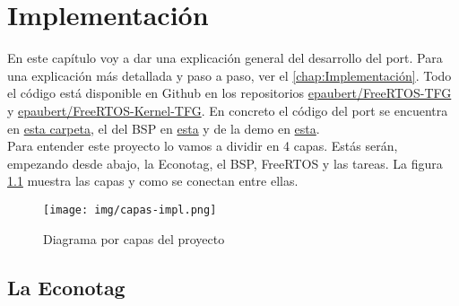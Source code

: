 \chapter{Implementación}


En este capítulo voy a dar una explicación general del desarrollo del port. Para una explicación más detallada y paso a paso, ver el \autoref{chap:Implementación}. Todo el código está disponible en Github en los repositorios \href{https://github.com/epaubert/FreeRTOS-TFG}{epaubert/FreeRTOS-TFG} y \href{https://github.com/epaubert/FreeRTOS-Kernel-TFG}{epaubert/FreeRTOS-Kernel-TFG}. En concreto el código del port se encuentra en \href{https://github.com/epaubert/FreeRTOS-Kernel-TFG/tree/main/portable/GCC/ARM7_MC13224V}{esta carpeta}, el del BSP en \href{https://github.com/epaubert/FreeRTOS-Kernel-TFG/tree/main/portable/GCC/ARM7_MC13224V/bsp}{esta} y de la demo en \href{https://github.com/epaubert/FreeRTOS-TFG/tree/main/FreeRTOS/Demo/ARM7_MC13224V_GCC}{esta}.
\\

Para entender este proyecto lo vamos a dividir en 4 capas. Estás serán, empezando desde abajo, la Econotag, el BSP, FreeRTOS y las tareas. La figura \ref{fig:capas} muestra las capas y como se conectan entre ellas.

\begin{figure}[!ht]
\centering
\texttt{[image: img/capas-impl.png]}
\caption{Diagrama por capas del proyecto}
\label{fig:capas}
\end{figure}

\section{La Econotag}

